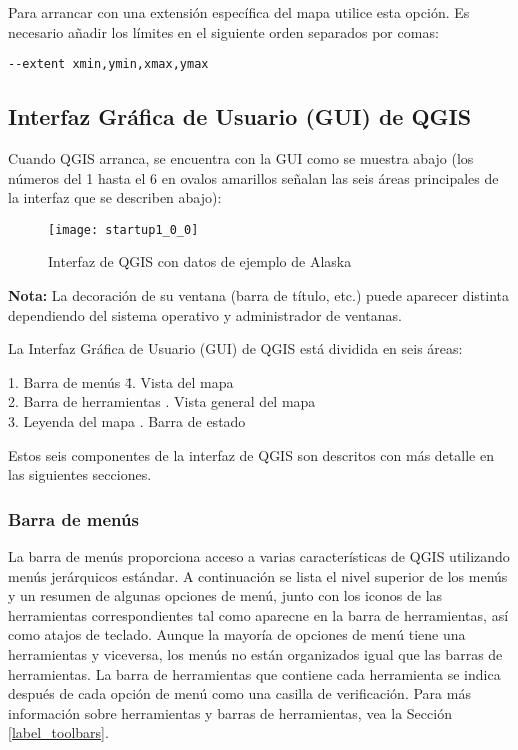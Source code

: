 Para arrancar con una extensión específica del mapa utilice esta opción. Es necesario
añadir los límites en el siguiente orden separados por comas:
\begin{verbatim}
--extent xmin,ymin,xmax,ymax
\end{verbatim}


\subsection{Interfaz Gráfica de Usuario (GUI) de QGIS}
\label{label_qgismainwindow}

Cuando QGIS arranca, se encuentra con la GUI como se muestra abajo
(los números del 1 hasta el 6 en ovalos amarillos señalan las seis áreas principales 
de la interfaz que se describen abajo):

\begin{figure}[ht]
   \begin{center}
   \caption{Interfaz de QGIS con datos de ejemplo de Alaska \wincaption}
	 \label{fig:startup}
   \texttt{[image: startup1\_0\_0]}
\end{center} 
\end{figure}

\textbf{Nota:} La decoración de su ventana (barra de título, etc.) puede aparecer 
distinta dependiendo del sistema operativo y administrador de ventanas.

La Interfaz Gráfica de Usuario (GUI) de QGIS está dividida en seis áreas:

\begin{tabbing}
1. Barra de menús \hspace{3cm}\= 4. Vista del mapa \\
2. Barra de herramientas \hspace{3cm}. Vista general del mapa \\
3. Leyenda del mapa \hspace{3cm}. Barra de estado   
\end{tabbing}

Estos seis componentes de la interfaz de QGIS son descritos con más detalle
en las siguientes secciones.

\subsubsection{Barra de menús}\label{label_menubar}

La barra de menús proporciona acceso a varias características de QGIS utilizando 
menús jerárquicos estándar. A continuación se lista el nivel superior de los menús
y un resumen de algunas opciones de menú, junto con los iconos de las herramientas
correspondientes tal como aparecne en la barra de herramientas, así como atajos de
teclado. Aunque la mayoría de opciones de menú tiene una herramientas y viceversa,
los menús no están organizados igual que las barras de herramientas. La barra de
herramientas que contiene cada herramienta se indica después de cada opción de menú
como una casilla de verificación. Para más información sobre herramientas y barras
de herramientas, vea la Sección \ref{label_toolbars}.

